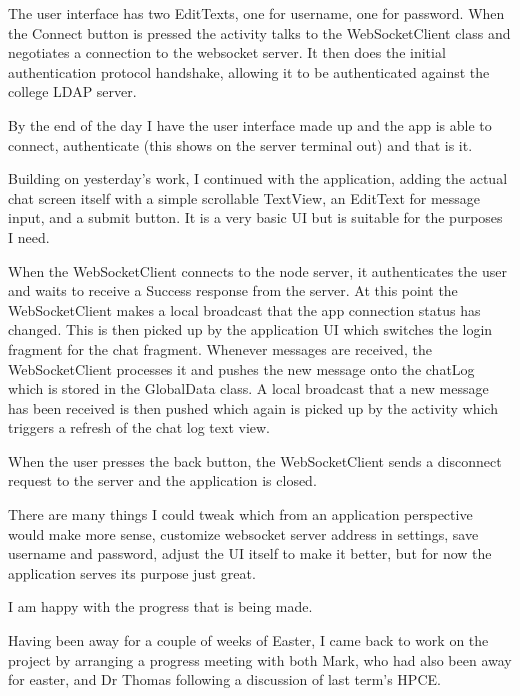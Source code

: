 \documentclass[idxtotoc,hyperref,openany]{labbook} %
\begin{document}
 The user interface has two EditTexts, one for username, one for password.  When the Connect button is pressed the activity talks to the WebSocketClient class and negotiates a connection to the websocket server.  It then does the initial authentication protocol handshake, allowing it to be authenticated against the college LDAP server.

 By the end of the day I have the user interface made up and the app is able to connect, authenticate (this shows on the server terminal out) and that is it.



 Building on yesterday's work, I continued with the application, adding the actual chat screen itself with a simple scrollable TextView, an EditText for message input, and a submit button.  It is a very basic UI but is suitable for the purposes I need.

 When the WebSocketClient connects to the node server, it authenticates the user and waits to receive a Success response from the server.  At this point the WebSocketClient makes a local broadcast that the app connection status has changed.  This is then picked up by the application UI which switches the login fragment for the chat fragment.  Whenever messages are received, the WebSocketClient processes it and pushes the new message onto the chatLog which is stored in the GlobalData class.  A local broadcast that a new message has been received is then pushed which again is picked up by the activity which triggers a refresh of the chat log text view.

 When the user presses the back button, the WebSocketClient sends a disconnect request to the server and the application is closed.

 There are many things I could tweak which from an application perspective would make more sense, customize websocket server address in settings, save username and password, adjust the UI itself to make it better, but for now the application serves its purpose just great.

 I am happy with the progress that is being made.



 Having been away for a couple of weeks of Easter, I came back to work on the project by arranging a progress meeting with both Mark, who had also been away for easter, and Dr Thomas following a discussion of last term's HPCE.
\end{document}
